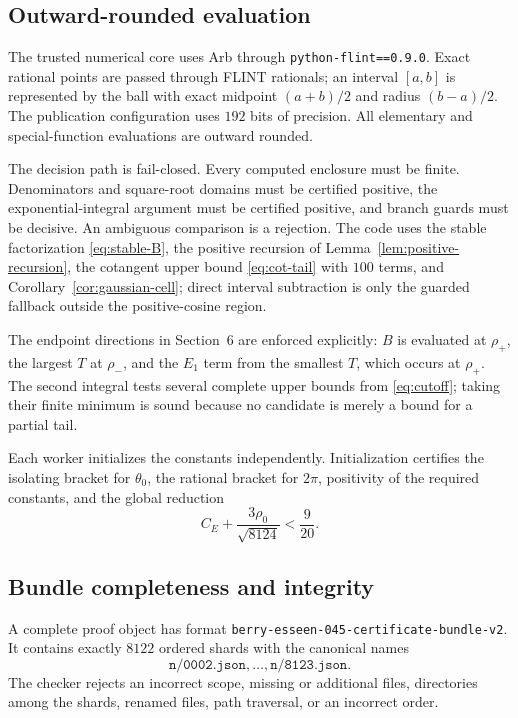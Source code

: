 \documentclass[11pt,a4paper,twoside]{article}
\theoremstyle{remark}
\newcommand{\rhozero}{\rho_{0}}
\newcommand{\code}[1]{\texttt{#1}}
\begin{document}
\subsection{Outward-rounded evaluation}

The trusted numerical core uses Arb through
\code{python-flint==0.9.0}.  Exact rational points are passed through FLINT
rationals; an interval \([a,b]\) is represented by the ball with exact
midpoint \((a+b)/2\) and radius \((b-a)/2\).  The publication configuration
uses \(192\) bits of precision.  All elementary and special-function
evaluations are outward rounded.

The decision path is fail-closed.  Every computed enclosure must be finite.
Denominators and square-root domains must be certified positive, the
exponential-integral argument must be certified positive, and branch guards
must be decisive.  An ambiguous comparison is a rejection.  The code uses
the stable factorization \eqref{eq:stable-B}, the positive recursion of
Lemma~\ref{lem:positive-recursion}, the cotangent upper bound
\eqref{eq:cot-tail} with \(100\) terms, and
Corollary~\ref{cor:gaussian-cell}; direct interval subtraction is only the
guarded fallback outside the positive-cosine region.

The endpoint directions in Section~6 are enforced explicitly:
\(B\) is evaluated at \(\rho_+\), the largest \(T\) at \(\rho_-\), and
the \(E_1\) term from the smallest \(T\), which occurs at \(\rho_+\).
The second integral tests several complete upper bounds from
\eqref{eq:cutoff}; taking their finite minimum is sound because no candidate
is merely a bound for a partial tail.

Each worker initializes the constants independently.  Initialization
certifies the isolating bracket for \(\theta_0\), the rational bracket for
\(2\pi\), positivity of the required constants, and the global reduction
\[
 C_E+\frac{3\rhozero}{\sqrt{8124}}<\frac9{20}.
\]

\subsection{Bundle completeness and integrity}

A complete proof object has format
\code{berry-esseen-045-certificate-bundle-v2}.  It contains exactly
\(8122\) ordered shards with the canonical names
\[
 \code{n/0002.json},\ldots,\code{n/8123.json}.
\]
The checker rejects an incorrect scope, missing or additional files,
directories among the shards, renamed files, path traversal, or an incorrect
order.
\end{document}
